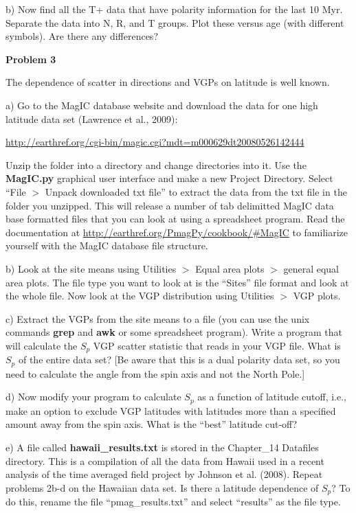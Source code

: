 {b) Now find all the T+ data that have polarity information for the last 10 Myr.  Separate the data into N, R, and T groups.   Plot these versus age (with different symbols).  Are there any differences?  

{\bf Problem 3}

The dependence of scatter in directions and VGPs on latitude is well known. 

a) Go to the MagIC database website and download the data for one high latitude data set (Lawrence et al., 2009):  \nocite{lawrence08}

 \url{http://earthref.org/cgi-bin/magic.cgi?mdt=m000629dt20080526142444}	

Unzip the folder into a directory and change directories into it.   Use the {\bf MagIC.py} graphical user interface  and make a new Project Directory.  Select ``File $>$ Unpack downloaded txt file'' to extract the data from the txt file  in the folder you unzipped.  This will release a number of tab delimitted MagIC data base formatted files that you can look at using a spreadsheet program.   Read the  documentation at  \url{http://earthref.org/PmagPy/cookbook/#MagIC}  to familiarize yourself with the MagIC database file structure. 

b)  Look at the site means using Utilities $>$ Equal area plots $>$ general equal area plots.  The file type you want to look at is the ``Sites'' file format and look at the whole file.   Now look at the VGP distribution using Utilities $>$ VGP plots.   


c) Extract the VGPs from the site means to a file (you can use the unix commands {\bf grep} and {\bf awk} or some spreadsheet program).  Write a program that will calculate the $S_p$ VGP scatter statistic that reads in your VGP file.   What is $S_p$ of the entire data set?  [Be aware that this is a dual polarity data set, so you need to calculate the angle from the spin axis and not the North Pole.]  

d)  Now modify your program to calculate $S_p$ as a function of  latitude cutoff, i.e., make an option to exclude VGP latitudes with latitudes more than a specified amount away from the spin axis.    What is the ``best'' latitude cut-off?  

e) A file called {\bf hawaii\_results.txt} is stored in the Chapter\_14 Datafiles directory.  This is a compilation of all the data from Hawaii used in a recent analysis of the time averaged field project by Johnson et al. (2008). \nocite{johnson08}
Repeat problems 2b-d on the Hawaiian data set.  Is there a latitude dependence of $S_p$?  To do this, rename the file 	``pmag\_results.txt'' and select ``results'' as the file type.  

}
